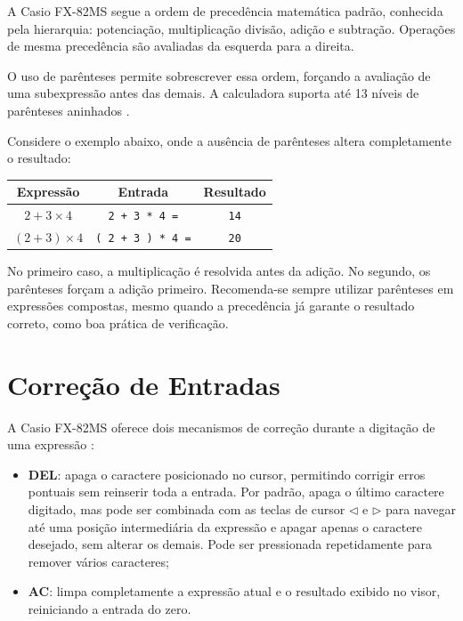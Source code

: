 A Casio FX-82MS segue a ordem de precedência matemática padrão, conhecida pela hierarquia: potenciação, multiplicação divisão, adição e subtração. Operações de mesma precedência são avaliadas da esquerda para a direita.

O uso de parênteses permite sobrescrever essa ordem, forçando a avaliação de uma subexpressão antes das demais. A calculadora suporta até 13 níveis de parênteses aninhados \cite{casio2004}.

Considere o exemplo abaixo, onde a ausência de parênteses altera completamente o resultado:

\begin{center}
\begin{tabular}{|c|c|c|}
    \hline
    \textbf{Expressão} & \textbf{Entrada} & \textbf{Resultado} \\
    \hline
    $2 + 3 \times 4$ & \texttt{2 + 3 * 4 =} & \texttt{14} \\
    $(2 + 3) \times 4$ & \texttt{( 2 + 3 ) * 4 =} & \texttt{20} \\
    \hline
\end{tabular}
\end{center}

No primeiro caso, a multiplicação é resolvida antes da adição. No segundo, os parênteses forçam a adição primeiro. Recomenda-se sempre utilizar parênteses em expressões compostas, mesmo quando a precedência já garante o resultado correto, como boa prática de verificação.

\section{Correção de Entradas}

A Casio FX-82MS oferece dois mecanismos de correção durante a digitação de uma expressão \cite{casio2004}:

\begin{itemize}
    \item \textbf{DEL}: apaga o caractere posicionado no cursor, permitindo 
    corrigir erros pontuais sem reinserir toda a entrada. Por padrão, apaga o 
    último caractere digitado, mas pode ser combinada com as teclas de cursor 
    \textbf{$\triangleleft$} e \textbf{$\triangleright$} para navegar até uma 
    posição intermediária da expressão e apagar apenas o caractere desejado, sem 
    alterar os demais. Pode ser pressionada repetidamente para remover vários 
    caracteres;
    \item \textbf{AC}: limpa completamente a expressão atual e o resultado 
    exibido no visor, reiniciando a entrada do zero.
\end{itemize}

